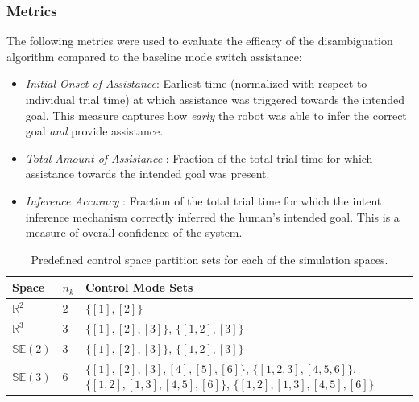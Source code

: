 \documentclass[conference]{IEEEtran}
\begin{document}
\subsubsection{Metrics}
The following metrics were used to evaluate the efficacy of the disambiguation algorithm compared to the baseline mode switch assistance:
\begin{itemize}
	\item \textit{Initial Onset of Assistance}: Earliest time (normalized with respect to individual trial time) at which assistance  was triggered towards the intended goal. This measure captures how \textit{early} the robot was able to infer the correct goal  \textit{and} provide assistance. 
	\item \textit{Total Amount of Assistance }: Fraction of the total trial time for which assistance towards the intended goal was present.  
	\item \textit{Inference Accuracy }: Fraction of the total trial time for which the intent inference mechanism correctly inferred the human's intended goal. This is a measure of overall confidence of the system. 
\end{itemize}
\begin{table}[t]
	\centering
	\begin{tabular}{|p{1cm}|p{0.5cm}|p{3cm}|}
		\hline
		\textbf{Space} & $n_k$ &\textbf{Control Mode Sets}  \\ \hline
		$\mathbb{R}^2$ & $2$ & $\{[1],[2]\}$ \\ \hline
		$\mathbb{R}^3$ & $3$ & $\{[1],[2], [3]\}$, $\{[1,2], [3]\}$ \\ \hline
		$\mathbb{SE}(2)$ & $3$ &  $\{[1],[2],[3]\}$, $\{[1,2], [3]\}$ \\ \hline
		$\mathbb{SE}(3)$ & $6$ & $\{[1],[2],[3],[4],[5],[6]\}$, $\{[1,2,3],  [4,5,6]\}$, $\{[1,2], [1,3], [4,5], [6]\}$, $\{[1,2], [1,3], [4,5], [6]\}$ \\ \hline
	\end{tabular}
	\vspace{.2cm}
	\caption{Predefined control space partition sets for each of the simulation spaces.} 
	\label{tbl:cmp}
	\vspace{-.5cm}
\end{table}
\end{document}
